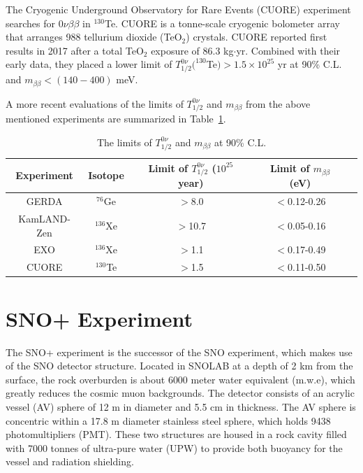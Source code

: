 \documentclass[preprint,12pt]{elsarticle}
\numberwithin{equation}{section}
\begin{document}
The Cryogenic Underground Observatory for Rare Events (CUORE) experiment searches for $0\nu\beta\beta$ in $^{130}$Te. CUORE is a tonne-scale cryogenic bolometer array that arranges 988 tellurium dioxide (TeO$_2$) crystals. CUORE reported first results in 2017 after a total TeO$_2$ exposure of 86.3 kg$\cdot$yr. Combined with their early data, they placed a lower limit of $T^{0\nu}_{1/2}(^{130}$Te$)>1.5\times 10^{25}$ yr at 90\% C.L. and $m_{\beta\beta}<(140-400)$  meV\cite{cuore}.

A more recent evaluations of the limits of $T^{0\nu}_{1/2}$ and $m_{\beta\beta}$ from the above mentioned experiments are summarized in Table~\ref{gerdatable}\cite{gerda2018}.
\begin{table}[ht]
	\caption{\label{gerdatable} The limits of $T^{0\nu}_{1/2}$ and $m_{\beta\beta}$ at 90\% C.L.}	
	{\centering
		\begin{tabular*}{135mm}{c@{\extracolsep{\fill}}cccc}
			\toprule 
			Experiment & Isotope & Limit of $T^{0\nu}_{1/2}$ ($10^{25}$ year) & Limit of $m_{\beta\beta}$ (eV)\\
			\midrule
			GERDA       & $^{76}$Ge & $>$8.0 & $<$0.12-0.26  \\	
			KamLAND-Zen & $^{136}$Xe & $>$10.7 & $<$0.05-0.16	\\
			EXO         & $^{136}$Xe & $>$1.1 & $<$0.17-0.49  \\	
			CUORE       & $^{130}$Te & $>$1.5 &  $<$0.11-0.50 \\	
			\bottomrule	
		\end{tabular*}
	}
\end{table}
\vspace{1cm}
\section{SNO+ Experiment}
The SNO+ experiment is the successor of the SNO experiment, which makes use of the SNO detector structure. Located in SNOLAB at a depth of 2 km from the surface, the rock overburden is about 6000 meter water equivalent (m.w.e), which greatly reduces the cosmic muon backgrounds. The detector consists of an acrylic vessel (AV) sphere of 12 m in diameter and 5.5 cm in thickness. The AV sphere is concentric within a 17.8 m diameter stainless steel sphere, which holds 9438 photomultipliers (PMT). These two structures are housed in a rock cavity filled with 7000 tonnes of ultra-pure water (UPW) to provide both buoyancy for the vessel and radiation shielding\cite{whitepaper, erica}.
\end{document}
